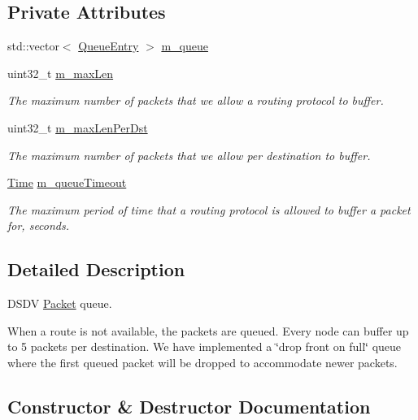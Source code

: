 \subsection*{Private Attributes}
\begin{DoxyCompactItemize}
\item 
std\+::vector$<$ \hyperlink{classns3_1_1dsdv_1_1QueueEntry}{Queue\+Entry} $>$ \hyperlink{classns3_1_1dsdv_1_1PacketQueue_a1388a88f87f1d1fbe7df390697621ebd}{m\+\_\+queue}
\item 
uint32\+\_\+t \hyperlink{classns3_1_1dsdv_1_1PacketQueue_af0cbe924a75db5d0656b36e1c82f4fb3}{m\+\_\+max\+Len}
\begin{DoxyCompactList}\small\item\em The maximum number of packets that we allow a routing protocol to buffer. \end{DoxyCompactList}\item 
uint32\+\_\+t \hyperlink{classns3_1_1dsdv_1_1PacketQueue_aae4d9a76d9a8e6ecfd833d77bd77b0ef}{m\+\_\+max\+Len\+Per\+Dst}
\begin{DoxyCompactList}\small\item\em The maximum number of packets that we allow per destination to buffer. \end{DoxyCompactList}\item 
\hyperlink{classns3_1_1Time}{Time} \hyperlink{classns3_1_1dsdv_1_1PacketQueue_af39d729c48cb48eeddb07f90f4b5ed2f}{m\+\_\+queue\+Timeout}
\begin{DoxyCompactList}\small\item\em The maximum period of time that a routing protocol is allowed to buffer a packet for, seconds. \end{DoxyCompactList}\end{DoxyCompactItemize}


\subsection{Detailed Description}
D\+S\+DV \hyperlink{classns3_1_1Packet}{Packet} queue. 

When a route is not available, the packets are queued. Every node can buffer up to 5 packets per destination. We have implemented a \char`\"{}drop front on full\char`\"{} queue where the first queued packet will be dropped to accommodate newer packets. 

\subsection{Constructor \& Destructor Documentation}
